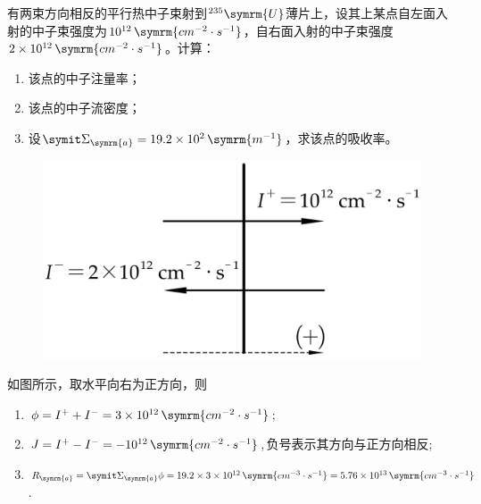 \begin{exercise}
    有两束方向相反的平行热中子束射到${}^{235}\symrm{U}$薄片上，设其上某点自左面入射的中子束强度为$10^{12}\,\symrm{cm^{-2}\cdot s^{-1}}$，自右面入射的中子束强度$2 \times 10^{12}\,\symrm{cm^{-2}\cdot s^{-1}}$。计算：
    \begin{enumerate}[(1)]
        \item 该点的中子注量率；
        \item 该点的中子流密度；
        \item 设$\vSigma_{\symrm{a}} = 19.2 \times 10^2\,\symrm{m^{-1}}$，求该点的吸收率。
    \end{enumerate}
    \begin{solution}
        \begin{figure}[H]
            \centering
            \includegraphics[scale=1.5]{figures/fig4.2.png}
        \end{figure}
        如图所示，取水平向右为正方向，则
        \begin{enumerate}[(1)]
            \item $\phi = I^{+} + I^{-} = 3\times 10^{12}\,\symrm{cm^{-2}\cdot s^{-1}}$;
            \item $J = I^{+} - I^{-} = -10^{12}\,\symrm{cm^{-2}\cdot s^{-1}}$,\,负号表示其方向与正方向相反;
            \item $R_{\symrm{a}} = \vSigma_{\symrm{a}}\phi = 19.2\times 3\times 10^{12}\,\symrm{cm^{-3}\cdot s^{-1}} = 5.76\times 10^{13}\,\symrm{cm^{-3}\cdot s^{-1}}$.
        \end{enumerate}
    \end{solution}
\end{exercise}

